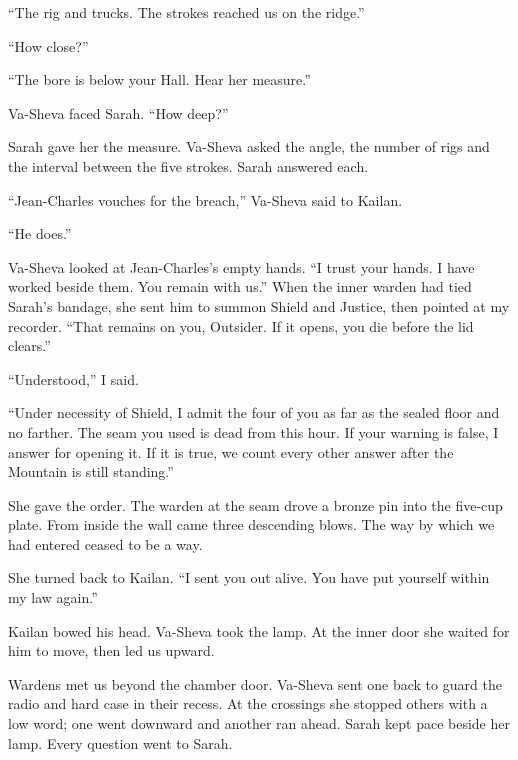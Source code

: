``The rig and trucks. The strokes reached us on the ridge.''\par

``How close?''\par

``The bore is below your Hall. Hear her measure.''\par

Va-Sheva faced Sarah. ``How deep?''\par

Sarah gave her the measure. Va-Sheva asked the angle, the number of rigs and the interval between the five strokes. Sarah answered each.\par

``Jean-Charles vouches for the breach,'' Va-Sheva said to Kailan.\par

``He does.''\par

Va-Sheva looked at Jean-Charles's empty hands. ``I trust your hands. I have worked beside them. You remain with us.'' When the inner warden had tied Sarah's bandage, she sent him to summon Shield and Justice, then pointed at my recorder. ``That remains on you, Outsider. If it opens, you die before the lid clears.''\par

``Understood,'' I said.\par

``Under necessity of Shield, I admit the four of you as far as the sealed floor and no farther. The seam you used is dead from this hour. If your warning is false, I answer for opening it. If it is true, we count every other answer after the Mountain is still standing.''\par

She gave the order. The warden at the seam drove a bronze pin into the five-cup plate. From inside the wall came three descending blows. The way by which we had entered ceased to be a way.\par

She turned back to Kailan. ``I sent you out alive. You have put yourself within my law again.''\par

Kailan bowed his head. Va-Sheva took the lamp. At the inner door she waited for him to move, then led us upward.\par

Wardens met us beyond the chamber door. Va-Sheva sent one back to guard the radio and hard case in their recess. At the crossings she stopped others with a low word; one went downward and another ran ahead. Sarah kept pace beside her lamp. Every question went to Sarah.\par

